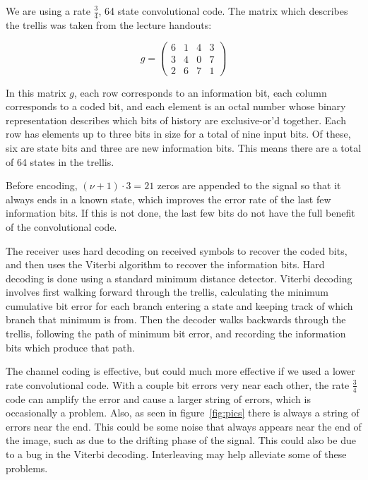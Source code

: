 \documentclass{article}
\begin{document}
We are using a rate $\frac{3}{4}$, 64 state convolutional code. The matrix
which describes the trellis was taken from the lecture handouts:

\[
  g =
  \begin{pmatrix}
    6 & 1 & 4 & 3 \\
    3 & 4 & 0 & 7 \\
    2 & 6 & 7 & 1
  \end{pmatrix}
\]

In this matrix $g$, each row corresponds to an information bit, each column
corresponds to a coded bit, and each element is an octal number whose binary
representation describes which bits of history are exclusive-or'd together. Each
row has elements up to three bits in size for a total of nine input bits. Of
these, six are state bits and three are new information bits. This means there
are a total of 64 states in the trellis.

Before encoding, $(\nu+1) \cdot 3 = 21$ zeros are appended to the signal so that
it always ends in a known state, which improves the error rate of the last few
information bits. If this is not done, the last few bits do not have the full
benefit of the convolutional code.

The receiver uses hard decoding on received symbols to recover the coded bits,
and then uses the Viterbi algorithm to recover the information bits. Hard
decoding is done using a standard minimum distance detector. Viterbi decoding
involves first walking forward through the trellis, calculating the minimum
cumulative bit error for each branch entering a state and keeping track of which
branch that minimum is from. Then the decoder walks backwards through the
trellis, following the path of minimum bit error, and recording the information
bits which produce that path.

The channel coding is effective, but could much more effective if we used a
lower rate convolutional code. With a couple bit errors very near each other,
the rate $\frac{3}{4}$ code can amplify the error and cause a larger string of
errors, which is occasionally a problem. Also, as seen in figure~\ref{fig:pics}
there is always a string of errors near the end. This could be some noise that
always appears near the end of the image, such as due to the drifting phase of
the signal. This could also be due to a bug in the Viterbi decoding.
Interleaving may help alleviate some of these problems.

\end{document}
